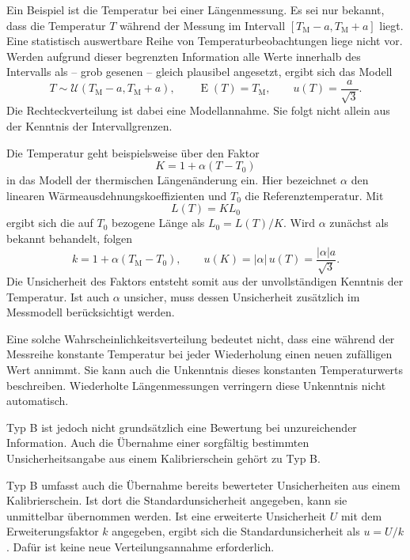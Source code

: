 Ein Beispiel ist die Temperatur bei einer Längenmessung. Es sei nur
bekannt, dass die Temperatur $T$ während der Messung im Intervall
$[T_\mathrm{M}-a,T_\mathrm{M}+a]$ liegt. Eine statistisch auswertbare Reihe von
Temperaturbeobachtungen liege nicht vor. Werden aufgrund dieser
begrenzten Information alle Werte innerhalb des Intervalls als -- grob gesenen -- gleich plausibel angesetzt, ergibt sich das Modell
\begin{equation}
T\sim\mathcal U(T_\mathrm{M}-a,T_\mathrm{M}+a),\qquad
\operatorname E(T)=T_\mathrm{M},\qquad
u(T)=\frac{a}{\sqrt 3}.
\end{equation}
Die Rechteckverteilung ist dabei eine Modellannahme. Sie folgt
nicht allein aus der Kenntnis der Intervallgrenzen.

Die Temperatur geht beispielsweise über den Faktor
\begin{equation}
K=1+\alpha(T-T_0)
\end{equation}
in das Modell der thermischen Längenänderung ein. Hier bezeichnet
$\alpha$ den linearen Wärmeausdehnungskoeffizienten und $T_0$ die
Referenztemperatur. Mit
\begin{equation}
L(T)=K L_0
\end{equation}
ergibt sich die auf $T_0$ bezogene Länge als $L_0=L(T)/K$.
Wird $\alpha$ zunächst als bekannt behandelt, folgen
\begin{equation}
k=1+\alpha(T_\mathrm{M}-T_0),\qquad
u(K)=|\alpha|\,u(T)=\frac{|\alpha|a}{\sqrt 3}.
\end{equation}
Die Unsicherheit des Faktors entsteht somit aus der unvollständigen
Kenntnis der Temperatur. Ist auch $\alpha$ unsicher, muss dessen
Unsicherheit zusätzlich im Messmodell berücksichtigt werden.

Eine solche Wahrscheinlichkeitsverteilung bedeutet nicht, dass eine
während der Messreihe konstante Temperatur bei jeder Wiederholung
einen neuen zufälligen Wert annimmt. Sie kann auch die Unkenntnis
dieses konstanten Temperaturwerts beschreiben. Wiederholte
Längenmessungen verringern diese Unkenntnis nicht automatisch.

Typ B ist jedoch nicht grundsätzlich eine Bewertung bei unzureichender
Information. Auch die Übernahme einer sorgfältig bestimmten
Unsicherheitsangabe aus einem Kalibrierschein gehört zu Typ B.

Typ B umfasst auch die Übernahme bereits bewerteter Unsicherheiten
aus einem Kalibrierschein. Ist dort die Standardunsicherheit angegeben,
kann sie unmittelbar übernommen werden. Ist eine erweiterte
Unsicherheit $U$ mit dem Erweiterungsfaktor $k$ angegeben, ergibt
sich die Standardunsicherheit als $u=U/k$. Dafür ist keine neue
Verteilungsannahme erforderlich.

